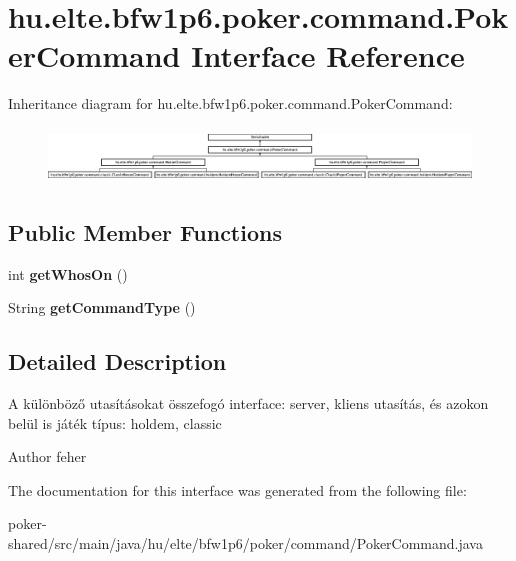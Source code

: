 \hypertarget{interfacehu_1_1elte_1_1bfw1p6_1_1poker_1_1command_1_1_poker_command}{}\section{hu.\+elte.\+bfw1p6.\+poker.\+command.\+Poker\+Command Interface Reference}
\label{interfacehu_1_1elte_1_1bfw1p6_1_1poker_1_1command_1_1_poker_command}
Inheritance diagram for hu.\+elte.\+bfw1p6.\+poker.\+command.\+Poker\+Command\+:\begin{figure}[H]
\begin{center}
\leavevmode
\includegraphics[height=1.481482cm]{interfacehu_1_1elte_1_1bfw1p6_1_1poker_1_1command_1_1_poker_command}
\end{center}
\end{figure}
\subsection*{Public Member Functions}
\begin{DoxyCompactItemize}
\item 
\hypertarget{interfacehu_1_1elte_1_1bfw1p6_1_1poker_1_1command_1_1_poker_command_a10c22d00a088d48c60d59920abd12975}{}int {\bfseries get\+Whos\+On} ()\label{interfacehu_1_1elte_1_1bfw1p6_1_1poker_1_1command_1_1_poker_command_a10c22d00a088d48c60d59920abd12975}

\item 
\hypertarget{interfacehu_1_1elte_1_1bfw1p6_1_1poker_1_1command_1_1_poker_command_a9caee21d75a481ee8ab548f399325b15}{}String {\bfseries get\+Command\+Type} ()\label{interfacehu_1_1elte_1_1bfw1p6_1_1poker_1_1command_1_1_poker_command_a9caee21d75a481ee8ab548f399325b15}

\end{DoxyCompactItemize}


\subsection{Detailed Description}
A különböző utasításokat összefogó interface\+: server, kliens utasítás, és azokon belül is játék típus\+: holdem, classic \begin{DoxyAuthor}{Author}
feher 
\end{DoxyAuthor}


The documentation for this interface was generated from the following file\+:\begin{DoxyCompactItemize}
\item 
poker-\/shared/src/main/java/hu/elte/bfw1p6/poker/command/Poker\+Command.\+java\end{DoxyCompactItemize}
